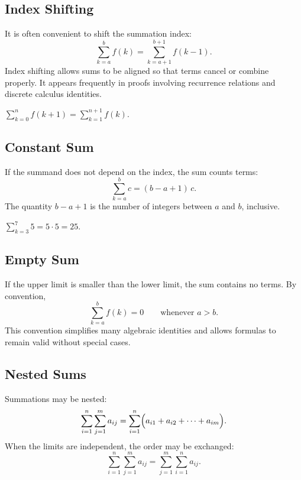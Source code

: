 \subsection*{Index Shifting}

\begin{remark*}[Interpretation]
It is often convenient to shift the summation index:
\[
\sum_{k=a}^{b} f(k)
=
\sum_{k=a+1}^{b+1} f(k-1).
\]
Index shifting allows sums to be aligned so that terms cancel or
combine properly. It appears frequently in proofs involving
recurrence relations and discrete calculus identities.
\end{remark*}

\begin{example*}
\(\displaystyle\sum_{k=0}^{n} f(k+1) = \sum_{k=1}^{n+1} f(k).\)
\end{example*}

\subsection*{Constant Sum}

\begin{remark*}[Interpretation]
If the summand does not depend on the index, the sum counts terms:
\[
\sum_{k=a}^{b} c = (b-a+1)\,c.
\]
The quantity \(b-a+1\) is the number of integers between \(a\) and \(b\),
inclusive.
\end{remark*}

\begin{example*}
\(\displaystyle\sum_{k=3}^{7} 5 = 5 \cdot 5 = 25.\)
\end{example*}

\subsection*{Empty Sum}

\begin{remark*}[Interpretation]
If the upper limit is smaller than the lower limit, the sum contains no
terms. By convention,
\[
\sum_{k=a}^{b} f(k) = 0 \qquad \text{whenever } a>b.
\]
This convention simplifies many algebraic identities and allows formulas
to remain valid without special cases.
\end{remark*}

\subsection*{Nested Sums}

\begin{remark*}[Interpretation]
Summations may be nested:
\[
\sum_{i=1}^{n}\sum_{j=1}^{m} a_{ij}
= \sum_{i=1}^{n} \Bigl(a_{i1}+a_{i2}+\cdots+a_{im}\Bigr).
\]
When the limits are independent, the order may be exchanged:
\[
\sum_{i=1}^{n}\sum_{j=1}^{m} a_{ij}
=
\sum_{j=1}^{m}\sum_{i=1}^{n} a_{ij}.
\]
\end{remark*}

